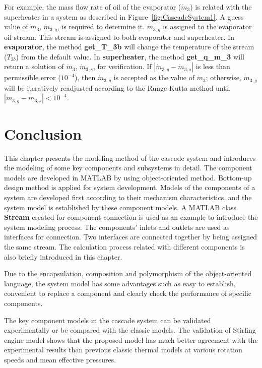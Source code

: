 For example, the mass flow rate of oil of the evaporator ($\dot{m}_3$) is related with the superheater in a system as described in Figure~\ref{fig:CascadeSystem1}.
A guess value of $\dot{m}_3$, $\dot{m}_{3,g}$, is required to determine it. $\dot{m}_{3,g}$ is assigned to the evaporator oil stream. This stream is assigned to both evaporator and superheater. In \textbf{evaporator}, the method \textbf{get\_T\_3b} will change the temperature of the stream ($T_{3b}$) from the default value. 
In \textbf{superheater}, the method \textbf{get\_q\_m\_3} will return a solution of $\dot{m}_3$, $\dot{m}_{3,s}$, for verification. If $\left|\dot{m}_{3,g} - \dot{m}_{3,s}\right|$ is less than permissible error ($10^{-4}$), then $\dot{m}_{3,g}$ is accepted as the value of $\dot{m}_{3}$; otherwise, $\dot{m}_{3,g}$ will be iteratively readjusted according to the Runge-Kutta method until $\left|\dot{m}_{3,g} - \dot{m}_{3,s}\right| < 10^{-4}$.

\section{Conclusion}

This chapter presents the modeling method of the cascade system and introduces the modeling of some key components and subsystems in detail. The component models are developed in MATLAB by using object-oriented method. Bottom-up design method is applied for system development. Models of the components of a system are developed first according to their mechanism characteristics, and the system model is established by these component models. A MATLAB class \textbf{Stream} created for component connection is used as an example to introduce the system modeling process. The components' inlets and outlets are used as interfaces for connection. 
Two interfaces are connected together by being assigned the same stream.
The calculation process related with different components is also briefly introduced in this chapter.

Due to the encapsulation, composition and polymorphism of the object-oriented language, the system model has some advantages such as easy to establish, convenient to replace a component and clearly check the performance of specific components.

The key component models in the cascade system can be validated experimentally or be compared with the classic models. The validation of Stirling engine model shows that the proposed model has much better agreement with the experimental results than previous classic thermal models at various rotation speeds and mean effective pressures.